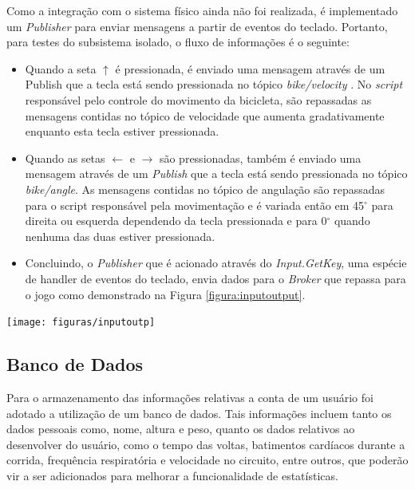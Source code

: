 Como a integração com o sistema físico ainda não foi realizada, é implementado um \textit{Publisher} para enviar mensagens a partir de eventos do teclado. Portanto, para testes do subsistema isolado, o fluxo de informações é o seguinte:

\begin{itemize}
\item Quando a seta ${\uparrow}$ é pressionada, é enviado uma mensagem através de um Publish que a tecla está sendo pressionada no tópico \textit{bike/velocity} . No \textit{script} responsável pelo controle do movimento da bicicleta, são repassadas as mensagens contidas no tópico de velocidade que aumenta gradativamente enquanto esta tecla estiver pressionada.
\item Quando as setas ${\leftarrow}$ e ${\rightarrow}$ são pressionadas, também é enviado uma mensagem através de um \textit{Publish} que a tecla está sendo pressionada no tópico \textit{bike/angle}. As mensagens contidas no tópico de angulação são repassadas para o script responsável pela movimentação e é variada então em 45$^{\circ}$  para direita ou esquerda dependendo da tecla pressionada e para 0$^{\circ}$  quando nenhuma das duas estiver pressionada.
\item Concluindo, o \textit{Publisher} que é acionado através do \textit{Input.GetKey}, uma espécie de handler de eventos do teclado,  envia dados para o \textit{Broker} que repassa para o jogo como demonstrado na Figura \ref{figura:inputoutput}.
\end{itemize}

\begin{center}
	\texttt{[image: figuras/inputoutp]}
	\label{figura:inputoutput}
\end{center}

\subsection{Banco de Dados}

Para o armazenamento das informações relativas a conta de um usuário foi adotado a utilização de um banco de dados. Tais informações incluem tanto os dados pessoais como, nome, altura e peso, quanto os dados relativos ao desenvolver do usuário, como o tempo das voltas, batimentos cardíacos durante a corrida, frequência respiratória e velocidade no circuito, entre outros, que poderão vir a ser adicionados para melhorar a funcionalidade de estatísticas.

